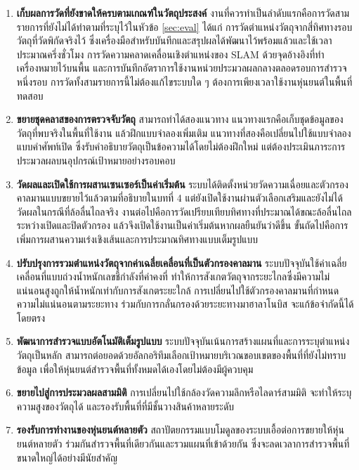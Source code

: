 \documentclass[a4paper,12pt]{report}
\begin{document}
\begin{enumerate}[label=\arabic*., leftmargin=1.25cm, itemsep=6pt, topsep=6pt]
    \item \textbf{เก็บผลการวัดที่ยังขาดให้ครบตามเกณฑ์ในวัตถุประสงค์}
    งานที่ควรทำเป็นลำดับแรกคือการวัดสามรายการที่ยังไม่ได้ทำตามที่ระบุไว้ในหัวข้อ \ref{sec:eval}
    ได้แก่ การวัดตำแหน่งวัตถุจากสี่ทิศทางรอบวัตถุที่วัดพิกัดจริงไว้
    ซึ่งเครื่องมือสำหรับบันทึกและสรุปผลได้พัฒนาไว้พร้อมแล้วและใช้เวลาประมาณครึ่งชั่วโมง
    การวัดความคลาดเคลื่อนเชิงตำแหน่งของ SLAM ด้วยจุดอ้างอิงที่ทำเครื่องหมายไว้บนพื้น
    และการบันทึกอัตราการใช้งานหน่วยประมวลผลกลางตลอดรอบการสำรวจหนึ่งรอบ
    การวัดทั้งสามรายการนี้ไม่ต้องแก้ไขระบบใด ๆ ต้องการเพียงเวลาใช้งานหุ่นยนต์ในพื้นที่ทดสอบ

    \item \textbf{ขยายชุดคลาสของการตรวจจับวัตถุ}
    สามารถทำได้สองแนวทาง แนวทางแรกคือเก็บชุดข้อมูลของวัตถุที่พบจริงในพื้นที่ใช้งาน
    แล้วฝึกแบบจำลองเพิ่มเติม แนวทางที่สองคือเปลี่ยนไปใช้แบบจำลองแบบคำศัพท์เปิด
    ซึ่งรับคำอธิบายวัตถุเป็นข้อความได้โดยไม่ต้องฝึกใหม่
    แต่ต้องประเมินภาระการประมวลผลบนอุปกรณ์เป้าหมายอย่างรอบคอบ

    \item \textbf{วัดผลและเปิดใช้การผสานเซนเซอร์เป็นค่าเริ่มต้น}
    ระบบได้ติดตั้งหน่วยวัดความเฉื่อยและตัวกรองคาลมานแบบขยายไว้แล้วตามที่อธิบายในบทที่ 4
    แต่ยังเปิดใช้งานผ่านตัวเลือกเสริมและยังไม่ได้วัดผลในกรณีที่ล้อลื่นไถลจริง
    งานต่อไปคือการวัดเปรียบเทียบทิศทางที่ประมาณได้ขณะล้อลื่นไถลระหว่างเปิดและปิดตัวกรอง
    แล้วจึงเปิดใช้งานเป็นค่าเริ่มต้นหากผลยืนยันว่าดีขึ้น
    ขั้นถัดไปคือการเพิ่มการผสานความเร่งเชิงเส้นและการประมาณทิศทางแบบเต็มรูปแบบ

    \item \textbf{ปรับปรุงการรวมตำแหน่งวัตถุจากค่าเฉลี่ยเคลื่อนที่เป็นตัวกรองคาลมาน}
    ระบบปัจจุบันใช้ค่าเฉลี่ยเคลื่อนที่แบบถ่วงน้ำหนักเลขชี้กำลังที่ค่าคงที่
    ทำให้การสังเกตวัตถุจากระยะไกลซึ่งมีความไม่แน่นอนสูงถูกให้น้ำหนักเท่ากับการสังเกตระยะใกล้
    การเปลี่ยนไปใช้ตัวกรองคาลมานที่กำหนดความไม่แน่นอนตามระยะทาง
    ร่วมกับการกลั่นกรองด้วยระยะทางมาฮาลาโนบิส จะแก้ข้อจำกัดนี้ได้โดยตรง

    \item \textbf{พัฒนาการสำรวจแบบอัตโนมัติเต็มรูปแบบ}
    ระบบปัจจุบันเน้นการสร้างแผนที่และการระบุตำแหน่งวัตถุเป็นหลัก
    สามารถต่อยอดด้วยอัลกอริทึมเลือกเป้าหมายบริเวณขอบเขตของพื้นที่ที่ยังไม่ทราบข้อมูล
    เพื่อให้หุ่นยนต์สำรวจพื้นที่ทั้งหมดได้เองโดยไม่ต้องมีผู้ควบคุม

    \item \textbf{ขยายไปสู่การประมวลผลสามมิติ}
    การเปลี่ยนไปใช้กล้องวัดความลึกหรือไลดาร์สามมิติ
    จะทำให้ระบุความสูงของวัตถุได้ และรองรับพื้นที่ที่มีชั้นวางสินค้าหลายระดับ

    \item \textbf{รองรับการทำงานของหุ่นยนต์หลายตัว}
    สถาปัตยกรรมแบบโมดูลของระบบเอื้อต่อการขยายให้หุ่นยนต์หลายตัว
    ร่วมกันสำรวจพื้นที่เดียวกันและรวมแผนที่เข้าด้วยกัน
    ซึ่งจะลดเวลาการสำรวจพื้นที่ขนาดใหญ่ได้อย่างมีนัยสำคัญ
\end{enumerate}
\end{document}
